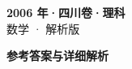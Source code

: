 \documentclass[zihao=-4, a4paper]{ctexart}
\begin{document}
\begin{center}
  {\Large\bfseries 2006 年·四川卷·理科}\\[4pt]
  {\large 数学 · 解析版}
\end{center}
\medskip
{}

\clearpage
{}
\begin{center}{\Large\bfseries 参考答案与详细解析}\end{center}
\medskip

\end{document}

